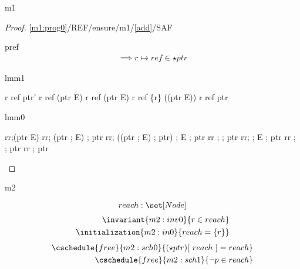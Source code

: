 \documentclass[12pt]{amsart}
\newcommand{\lookup}[2]{#1[#2]}
\begin{document}
\begin{machine}{m1}
\begin{proof}{\ref{m1:prog0}/REF/ensure/m1/\ref{add}/SAF}
\begin{free:var}{p}{ref}
\begin{align*}
{		\implies r \mapsto ref \in \star ptr }
\end{align*}
\easy
\begin{subproof}{lmm1}
\begin{calculation}
	r \mapsto ref \in \star ptr'
\hint{=}{ \eqref{m1:act0} }
	r \mapsto ref \in \star (ptr \bunion E)
	r \mapsto ref \in \star (ptr \bunion E)
	r \mapsto ref \in \{r\} \rdomres (\star (ptr \bunion E))
\hint{=}{ }
	r \mapsto ref \in \star ptr
\end{calculation}
\end{subproof}
\end{free:var}
\begin{subproof}{lmm0}
\begin{calculation}
	rr;\star (ptr \0\bunion E)
\hint{=}{ }
	rr; \star (\star ptr ; E) ; \star ptr
\hint{=}{ }
	rr; (\star (\star ptr ; E) ; \star ptr) ; E ; \star ptr 
	\2\bunion rr ; \id ; \star ptr
\hint{\subseteq}{ }
	rr; \all ; E ; \star ptr 
	\2\bunion rr ; \id ; \star ptr
\hint{=}{ }
	rr ; \star ptr
\end{calculation}	
\end{subproof}
\end{proof}

\end{machine}

	

\begin{machine}{m2}

	\[ \variable{reach : \set[Node]} \]
\begin{align}
	\invariant{m2:inv0}{ r \in reach } \\
	\initialization{m2:in0}{ reach = \{r\} }
\end{align}
\begin{align}
	\cschedule{free}{m2:sch0}
		{ \lookup{(\star ptr)}{~reach~} = reach } \\
	\cschedule{free}{m2:sch1}{ \neg p \in reach }
\end{align}

\end{machine}
\end{document}
